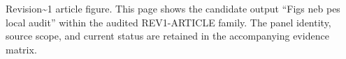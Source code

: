 Revision\textasciitilde{}1 article figure. This page shows the candidate output ``Figs neb pes local audit'' within the audited REV1-ARTICLE family. The panel identity, source scope, and current status are retained in the accompanying evidence matrix.
